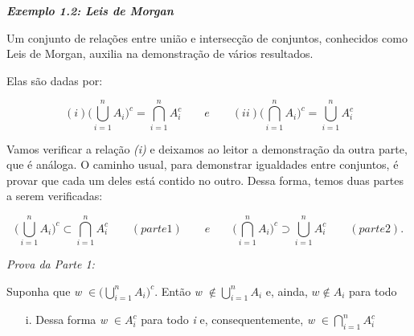 \documentclass[a4paper,notitlepage]{book}
\begin{document}
\noindent \textit{\textbf{Exemplo 1.2: Leis de Morgan}}

\hfill Um conjunto de relações entre união e intersecção de conjuntos, conhecidos como Leis de Morgan, auxilia na demonstração de vários resultados.

\noindent Elas são dadas por:

$$ (i) \Big(\bigcup_{i=1}^{n} A_{i} \Big)^c  = \bigcap_{i=1}^{n} A_{i}^c \qquad e \qquad (ii) \Big(\bigcap_{i=1}^{n} A_{i} \Big)^c  = \bigcup_{i=1}^{n} A_{i}^c$$

Vamos verificar a relação \textit{(i)} e deixamos ao leitor a demonstração da outra parte, que é análoga. O caminho usual, para demonstrar igualdades entre conjuntos, é provar que cada um deles está contido no outro. Dessa forma, temos duas partes a serem verificadas:

$$ \Big(\bigcup_{i=1}^{n} A_{i} \Big)^c  \subset \bigcap_{i=1}^{n} A_{i}^c \qquad (parte 1)\qquad e \qquad \Big(\bigcap_{i=1}^{n} A_{i} \Big)^c \supset \bigcup_{i=1}^{n} A_{i}^c \qquad (parte 2).$$

\noindent \textit{Prova da Parte 1:}

Suponha que \textit{w} $\in \Big(\bigcup_{i=1}^{n} A_{i} \Big)^c$. Então \textit{w} $\notin \bigcup_{i=1}^{n} A_{i}$ e, ainda, $w \notin A_i$ para todo

\begin{itemize}
\item[i.] Dessa forma \textit{w} $\in A_{i}^c$ para todo \textit{i} e, consequentemente, \textit{w} $\in \bigcap_{i=1}^{n} A_{i}^c$ 
 
\end{itemize}
\end{document}
